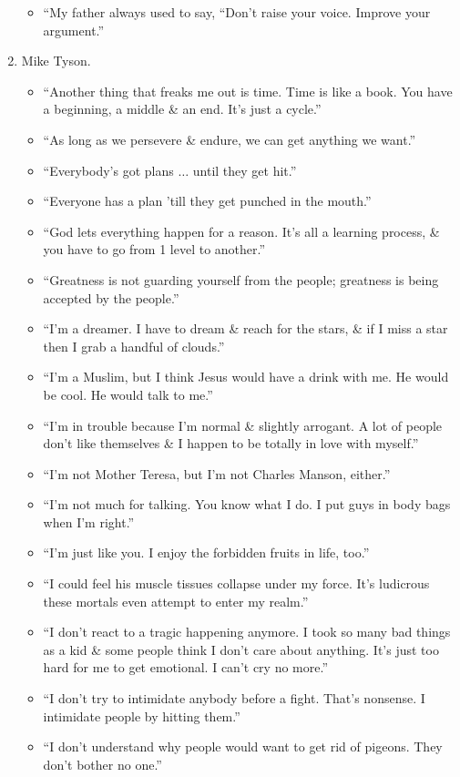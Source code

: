 \documentclass{article}
\begin{document}
\begin{enumerate}
\begin{itemize}
		\item ``My father always used to say, ``Don't raise your voice. Improve your argument.''
	\end{itemize}
	\item {\sc Mike Tyson.}
	\begin{itemize}
		\item ``Another thing that freaks me out is time. Time is like a book. You have a beginning, a middle \& an end. It's just a cycle.''
		\item ``As long as we persevere \& endure, we can get anything we want.''
		\item ``Everybody's got plans $\ldots$ until they get hit.''
		\item ``Everyone has a plan 'till they get punched in the mouth.''
		\item ``God lets everything happen for a reason. It's all a learning process, \& you have to go from 1 level to another.''
		\item ``Greatness is not guarding yourself from the people; greatness is being accepted by the people.''
		\item ``I'm a dreamer. I have to dream \& reach for the stars, \& if I miss a star then I grab a handful of clouds.''
		\item ``I'm a Muslim, but I think Jesus would have a drink with me. He would be cool. He would talk to me.''
		\item ``I'm in trouble because I'm normal \& slightly arrogant. A lot of people don't like themselves \& I happen to be totally in love with myself.''
		\item ``I'm not Mother Teresa, but I'm not Charles Manson, either.''
		\item ``I'm not much for talking. You know what I do. I put guys in body bags when I'm right.''
		\item ``I'm just like you. I enjoy the forbidden fruits in life, too.''
		\item ``I could feel his muscle tissues collapse under my force. It's ludicrous these mortals even attempt to enter my realm.''
		\item ``I don't react to a tragic happening anymore. I took so many bad things as a kid \& some people think I don't care about anything. It's just too hard for me to get emotional. I can't cry no more.''
		\item ``I don't try to intimidate anybody before a fight. That's nonsense. I intimidate people by hitting them.''
		\item ``I don't understand why people would want to get rid of pigeons. They don't bother no one.''

\end{itemize}
\end{enumerate}
\end{document}

